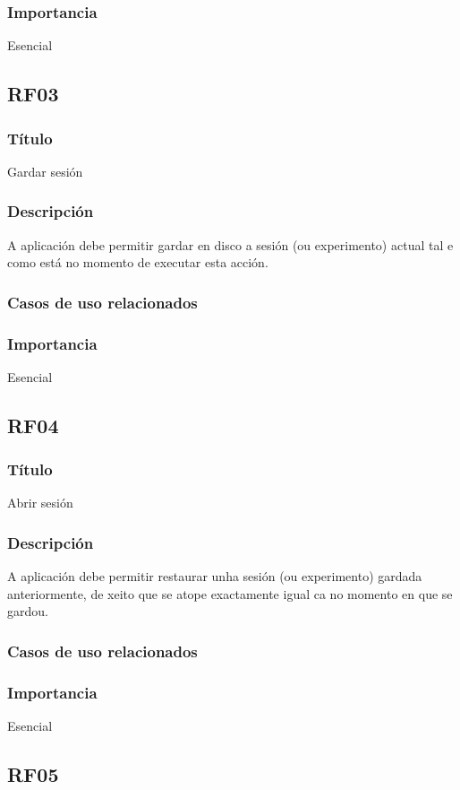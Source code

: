 \subsubsection{Importancia}
Esencial

\subsection{RF03}
\subsubsection{Título}
Gardar sesión
\subsubsection{Descripción}
A aplicación debe permitir gardar en disco a sesión (ou experimento) actual tal e como está no momento de executar esta acción.
\subsubsection{Casos de uso relacionados}
\subsubsection{Importancia}
Esencial

\subsection{RF04}
\subsubsection{Título}
Abrir sesión
\subsubsection{Descripción}
A aplicación debe permitir restaurar unha sesión (ou experimento) gardada anteriormente, de xeito que se atope exactamente igual ca no momento en que se gardou.
\subsubsection{Casos de uso relacionados}
\subsubsection{Importancia}
Esencial

\subsection{RF05}
